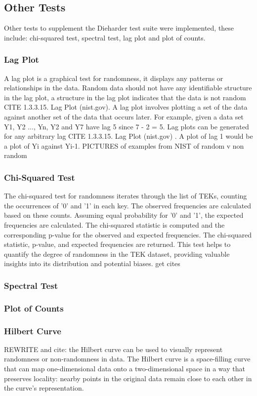 \subsection{Other Tests}

Other tests to supplement the Dieharder test suite were implemented, these include: chi-squared test, spectral test, lag plot and plot of counts.\newline

\subsubsection{Lag Plot}
A lag plot is a graphical test for randomness, it displays any patterns or relationships in the data. Random data should not have any identifiable structure in the lag plot, a structure in the lag plot indicates that the data is not random CITE 1.3.3.15. Lag Plot (nist.gov). A lag plot involves plotting a set of the data against another set of the data that occurs later. For example, given a data set Y1, Y2 ..., Yn, Y2 and Y7 have lag 5 since 7 - 2 = 5. Lag plots can be generated for any arbitrary lag CITE 1.3.3.15. Lag Plot (nist.gov) . A plot of lag 1 would be a plot of Yi against Yi-1. PICTURES of examples from NIST of random v non random

\subsubsection{Chi-Squared Test}
The chi-squared test for randomness iterates through the list of TEKs, counting the occurrences of '0' and '1' in each key. The observed frequencies are calculated based on these counts. Assuming equal probability for '0' and '1', the expected frequencies are calculated. The chi-squared statistic is computed and the corresponding p-value for the observed and expected frequencies. The chi-squared statistic, p-value, and expected frequencies are returned. This test helps to quantify the degree of randomness in the TEK dataset, providing valuable insights into its distribution and potential biases. get cites

\subsubsection{Spectral Test}
\subsubsection{Plot of Counts}
\subsubsection{Hilbert Curve}
REWRITE and cite: the Hilbert curve can be used to visually represent randomness or non-randomness in data. The Hilbert curve is a space-filling curve that can map one-dimensional data onto a two-dimensional space in a way that preserves locality: nearby points in the original data remain close to each other in the curve's representation.

